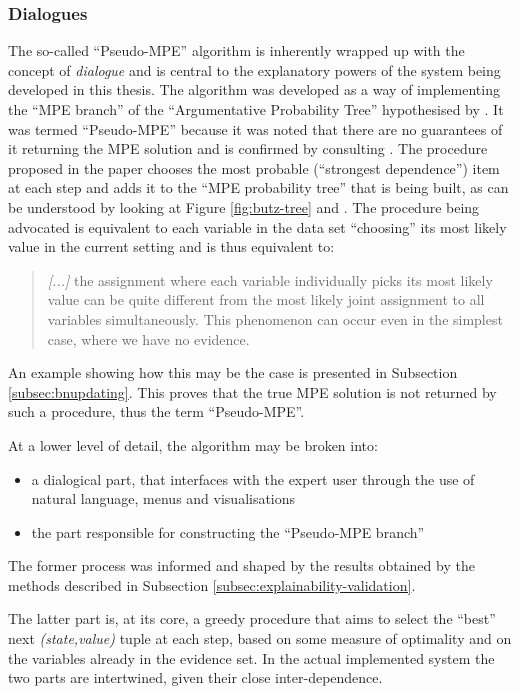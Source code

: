 \subsubsection{Dialogues} \label{subsubsec:dialogues}
The so-called \enquote{Pseudo-MPE} algorithm is inherently wrapped up with the concept of \textit{dialogue} and is central to the explanatory powers of the system being developed in this thesis.
The algorithm was developed as a way of implementing the \enquote{MPE branch} of the \enquote{Argumentative Probability Tree} hypothesised by \citet{Butz2018}.
It was termed \enquote{Pseudo-MPE} because it was noted that there are no guarantees of it returning the MPE solution and is confirmed by consulting \citep[pag. 26]{koller2007}.
The procedure proposed in the paper chooses the most probable (\enquote{strongest dependence}) item at each step and adds it to the \enquote{MPE probability tree} that is being built, as can be understood by looking at Figure \ref{fig:butz-tree} and \citep[sec. 3.1 and 4.3]{Butz2018}.
The procedure being advocated is equivalent to each variable in the data set \enquote{choosing} its most likely value in the current setting and is thus equivalent to:
\begin{quotation}
	\textit{[...]} the assignment where each variable individually picks its most likely value can be quite different from the most likely joint assignment to all variables simultaneously. This phenomenon can occur even in the simplest case, where we have no evidence.
	\hfill \citep[pag. 26]{koller2007}
\end{quotation}
An example showing how this may be the case is presented in Subsection \ref{subsec:bnupdating}.
This proves that the true MPE solution is not returned by such a procedure, thus the term \enquote{Pseudo-MPE}.

At a lower level of detail, the algorithm may be broken into:
\begin{itemize}
	\item a dialogical part, that interfaces with the expert user through the use of natural language, menus and visualisations
	\item the part responsible for constructing the \enquote{Pseudo-MPE branch}
\end{itemize}
The former process was informed and shaped by the results obtained by the methods described in Subsection \ref{subsec:explainability-validation}.

The latter part is, at its core, a greedy procedure that aims to select the \enquote{best} next \textit{(state,value)} tuple at each step, based on some measure of optimality and on the variables already in the evidence set.
In the actual implemented system the two parts are intertwined, given their close inter-dependence.

